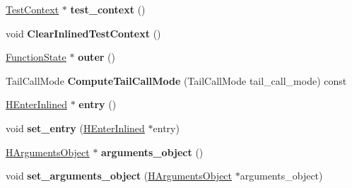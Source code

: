 \begin{DoxyCompactItemize}
\item 
\hyperlink{classv8_1_1internal_1_1_test_context}{Test\+Context} $\ast$ {\bfseries test\+\_\+context} ()\hypertarget{classv8_1_1internal_1_1_function_state_a79edfb798a56400d12975c2638cb8d7b}{}\label{classv8_1_1internal_1_1_function_state_a79edfb798a56400d12975c2638cb8d7b}

\item 
void {\bfseries Clear\+Inlined\+Test\+Context} ()\hypertarget{classv8_1_1internal_1_1_function_state_a029a29f74b3560654d12987106cf910f}{}\label{classv8_1_1internal_1_1_function_state_a029a29f74b3560654d12987106cf910f}

\item 
\hyperlink{classv8_1_1internal_1_1_function_state}{Function\+State} $\ast$ {\bfseries outer} ()\hypertarget{classv8_1_1internal_1_1_function_state_aec4dcb077e31b6f6b98a1d28fb24c6e2}{}\label{classv8_1_1internal_1_1_function_state_aec4dcb077e31b6f6b98a1d28fb24c6e2}

\item 
Tail\+Call\+Mode {\bfseries Compute\+Tail\+Call\+Mode} (Tail\+Call\+Mode tail\+\_\+call\+\_\+mode) const \hypertarget{classv8_1_1internal_1_1_function_state_ab777f8842eeea64bb1d6b0bbfc7ce4fb}{}\label{classv8_1_1internal_1_1_function_state_ab777f8842eeea64bb1d6b0bbfc7ce4fb}

\item 
\hyperlink{classv8_1_1internal_1_1_h_enter_inlined}{H\+Enter\+Inlined} $\ast$ {\bfseries entry} ()\hypertarget{classv8_1_1internal_1_1_function_state_a2525b32c9e63db5b5d12a6cf73597f14}{}\label{classv8_1_1internal_1_1_function_state_a2525b32c9e63db5b5d12a6cf73597f14}

\item 
void {\bfseries set\+\_\+entry} (\hyperlink{classv8_1_1internal_1_1_h_enter_inlined}{H\+Enter\+Inlined} $\ast$entry)\hypertarget{classv8_1_1internal_1_1_function_state_a5cbcb7065c34c64640048c399c7762e9}{}\label{classv8_1_1internal_1_1_function_state_a5cbcb7065c34c64640048c399c7762e9}

\item 
\hyperlink{classv8_1_1internal_1_1_h_arguments_object}{H\+Arguments\+Object} $\ast$ {\bfseries arguments\+\_\+object} ()\hypertarget{classv8_1_1internal_1_1_function_state_a32e6bf80d61827ac838ce5fc507c67e6}{}\label{classv8_1_1internal_1_1_function_state_a32e6bf80d61827ac838ce5fc507c67e6}

\item 
void {\bfseries set\+\_\+arguments\+\_\+object} (\hyperlink{classv8_1_1internal_1_1_h_arguments_object}{H\+Arguments\+Object} $\ast$arguments\+\_\+object)\hypertarget{classv8_1_1internal_1_1_function_state_aba1e8b55376eabb6cd1ef8479caf874b}{}\label{classv8_1_1internal_1_1_function_state_aba1e8b55376eabb6cd1ef8479caf874b}


\end{DoxyCompactItemize}
